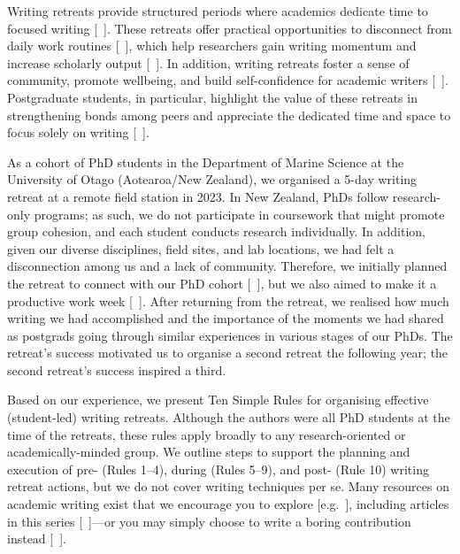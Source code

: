\documentclass[10pt,letterpaper]{article}
\begin{document}
Writing retreats provide structured periods where academics dedicate time to focused writing [~\cite{mcgrail2006, murray2009}]. These retreats offer practical opportunities to disconnect from daily work routines [~\cite{murray2013, tremblay2021}], which help researchers gain writing momentum and increase scholarly output [~\cite{mcgrail2006, kornhaber2016}]. In addition, writing retreats foster a sense of community, promote wellbeing, and build self-confidence for academic writers [~\cite{kornhaber2016, eardley2021, tremblay2021}]. Postgraduate students, in particular, highlight the value of these retreats in strengthening bonds among peers and appreciate the dedicated time and space to focus solely on writing [~\cite{kornhaber2016, papen2018, tremblay2021, bojovic2024}].

As a cohort of PhD students in the Department of Marine Science at the University of Otago (Aotearoa/New Zealand), we organised a 5-day writing retreat at a remote field station in 2023. In New Zealand, PhDs follow research-only programs; as such, we do not participate in coursework that might promote group cohesion, and each student conducts research individually. In addition, given our diverse disciplines, field sites, and lab locations, we had felt a disconnection among us and a lack of community. Therefore, we initially planned the retreat to connect with our PhD cohort [~\cite{omeara2017, bernery2022}], but we also aimed to make it a productive work week [~\cite{mcgrail2006, kornhaber2016}]. After returning from the retreat, we realised how much writing we had accomplished and the importance of the moments we had shared as postgrads going through similar experiences in various stages of our PhDs. The retreat's success motivated us to organise a second retreat the following year; the second retreat's success inspired a third.

Based on our experience, we present Ten Simple Rules for organising effective (student-led) writing retreats. Although the authors were all PhD students at the time of the retreats, these rules apply broadly to any research-oriented or academically-minded group. We outline steps to support the planning and execution of pre- (Rules 1--4), during (Rules 5--9), and post- (Rule 10) writing retreat actions, but we do not cover writing techniques per se. Many resources on academic writing exist that we encourage you to explore [e.g.~\cite{turbek2016, hotaling2020, carter2020, cargill2021}], including articles in this series [~\cite{weinberger2015, mensh2017, peterson2018}]---or you may simply choose to write a boring contribution instead [~\cite{sand2007}].
\end{document}
